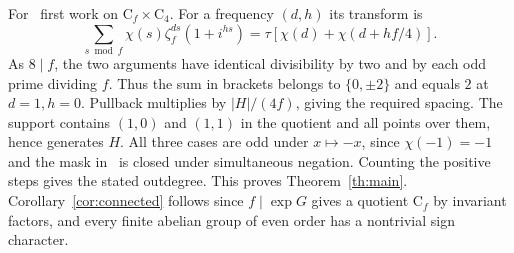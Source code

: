 \documentclass[11pt,letterpaper]{article}
\newcommand{\Cyc}{\mathrm C}
\newcommand{\z}{\zeta}
\begin{document}
For \ee\ first work on $\Cyc_f\times\Cyc_4$. For a frequency $(d,h)$ its transform is
\[
 \sum_{s\bmod f}\chi(s)\z_f^{ds}(1+i^{hs})
   =\tau\left[\chi(d)+\chi(d+hf/4)\right].
\]
As $8\mid f$, the two arguments have identical divisibility by two and by each odd prime dividing $f$. Thus the sum in brackets belongs to $\{0,\pm2\}$ and equals $2$ at $d=1,h=0$. Pullback multiplies by $|H|/(4f)$, giving the required spacing. The support contains $(1,0)$ and $(1,1)$ in the quotient and all points over them, hence generates $H$. All three cases are odd under $x\mapsto-x$, since $\chi(-1)=-1$ and the mask in \ee\ is closed under simultaneous negation. Counting the positive steps gives the stated outdegree. This proves Theorem~\ref{th:main}. Corollary~\ref{cor:connected} follows since $f\mid\exp G$ gives a quotient $\Cyc_f$ by invariant factors, and every finite abelian group of even order has a nontrivial sign character.
\end{document}

